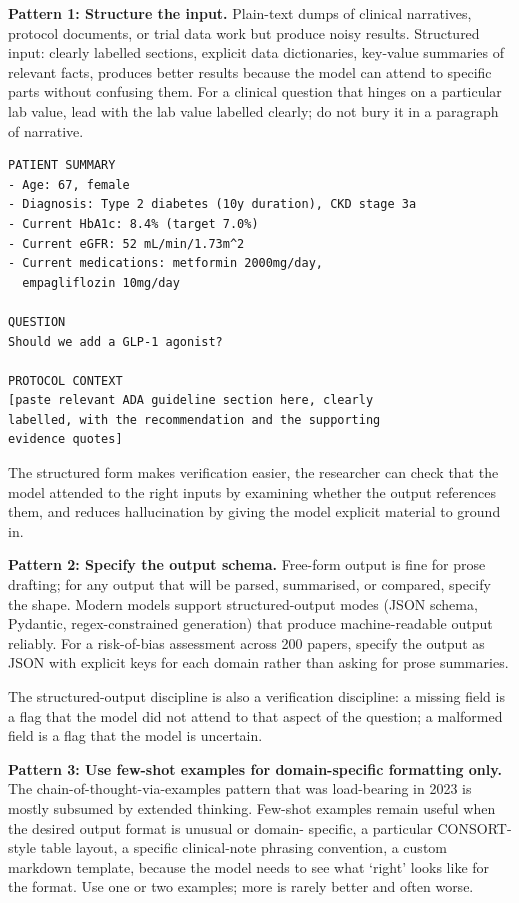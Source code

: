 \documentclass[
  letterpaper,
  11pt]{scrbook}
\begin{document}
\textbf{Pattern 1: Structure the input.} Plain-text dumps of clinical
narratives, protocol documents, or trial data work but produce noisy
results. Structured input: clearly labelled sections, explicit data
dictionaries, key-value summaries of relevant facts, produces better
results because the model can attend to specific parts without confusing
them. For a clinical question that hinges on a particular lab value,
lead with the lab value labelled clearly; do not bury it in a paragraph
of narrative.

\begin{verbatim}
PATIENT SUMMARY
- Age: 67, female
- Diagnosis: Type 2 diabetes (10y duration), CKD stage 3a
- Current HbA1c: 8.4% (target 7.0%)
- Current eGFR: 52 mL/min/1.73m^2
- Current medications: metformin 2000mg/day,
  empagliflozin 10mg/day

QUESTION
Should we add a GLP-1 agonist?

PROTOCOL CONTEXT
[paste relevant ADA guideline section here, clearly
labelled, with the recommendation and the supporting
evidence quotes]
\end{verbatim}

The structured form makes verification easier, the researcher can check
that the model attended to the right inputs by examining whether the
output references them, and reduces hallucination by giving the model
explicit material to ground in.

\textbf{Pattern 2: Specify the output schema.} Free-form output is fine
for prose drafting; for any output that will be parsed, summarised, or
compared, specify the shape. Modern models support structured-output
modes (JSON schema, Pydantic, regex-constrained generation) that produce
machine-readable output reliably. For a risk-of-bias assessment across
200 papers, specify the output as JSON with explicit keys for each
domain rather than asking for prose summaries.

The structured-output discipline is also a verification discipline: a
missing field is a flag that the model did not attend to that aspect of
the question; a malformed field is a flag that the model is uncertain.

\textbf{Pattern 3: Use few-shot examples for domain-specific formatting
only.} The chain-of-thought-via-examples pattern that was load-bearing
in 2023 is mostly subsumed by extended thinking. Few-shot examples
remain useful when the desired output format is unusual or domain-
specific, a particular CONSORT-style table layout, a specific
clinical-note phrasing convention, a custom markdown template, because
the model needs to see what `right' looks like for the format. Use one
or two examples; more is rarely better and often worse.
\end{document}
